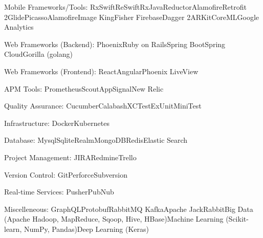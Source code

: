 \documentclass[10pt,a4paper]{article} %
\begin{document}
\inlineheadsection %
{Mobile Frameworks/Tools:}
{RxSwift\bull ReSwift\bull RxJava\bull Reductor\bull Alamofire\bull Retrofit 2\bull Glide\bull Picasso\bull AlamofireImage \bull KingFisher
\bull Firebase\bull Dagger 2\bull ARKit\bull CoreML\bull Google Analytics}

\inlineheadsection %
{Web Frameworks (Backend):}
{Phoenix\bull Ruby on Rails\bull Spring Boot\bull Spring Cloud\bull Gorilla (golang)}

\inlineheadsection %
{Web Frameworks (Frontend):}
{React\bull Angular\bull Phoenix LiveView}

\inlineheadsection %
{APM Tools:}
{Prometheus\bull Scout\bull AppSignal\bull New Relic}

\inlineheadsection %
{Quality Assurance:}
{Cucumber\bull Calabash\bull XCTest\bull ExUnit\bull MiniTest}

\inlineheadsection %
{Infrastructure:}
{Docker\bull Kubernetes}

\inlineheadsection %
{Database:}
{Mysql\bull Sqlite\bull Realm\bull MongoDB\bull Redis\bull Elastic Search}

\inlineheadsection %
{Project Management:}
{JIRA\bull Redmine\bull Trello}

\inlineheadsection %
{Version Control:}
{Git\bull Perforce\bull Subversion}

\inlineheadsection %
{Real-time Services:}
{Pusher\bull PubNub}

\inlineheadsection %
{Miscelleneous:}
{GraphQL\bull Protobuf\bull RabbitMQ \bull Kafka\bull Apache JackRabbit\bull Big Data (Apache Hadoop, MapReduce, Sqoop, Hive, HBase)\bull Machine Learning (Scikit-learn, NumPy, Pandas)\bull Deep Learning (Keras)}

\end{document}
